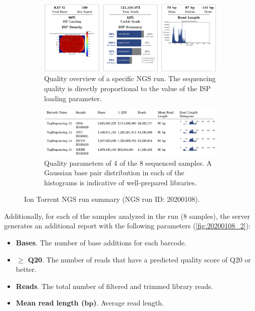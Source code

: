 \begin{figure}[ht]
    \centering
    \begin{subfigure}{0.85\textwidth}
        \centering
        \includegraphics[width=\textwidth]{Images/chapter_3/20200108/20200108_1.png}
        \caption{Quality overview of a specific NGS run. The sequencing quality is directly proportional to the value of the ISP loading parameter. \\}
        \label{fig:20200108_1}
    \end{subfigure}
    \hfill
    \begin{subfigure}{0.85\textwidth}
        \centering
        \includegraphics[width=\textwidth]{Images/chapter_3/20200108/20200108_2_v2.png}
        \caption{Quality parameters of 4 of the 8 sequenced samples. A Gaussian  base pair distribution in each of the histograms is indicative of well-prepared libraries.}
        \label{fig:20200108_2}
    \end{subfigure}
    \hfill
    \caption{Ion Torrent\texttrademark{} NGS run summary (NGS run ID: 20200108).}
    \label{fig:NGS_summary}
\end{figure}

Additionally, for each of the samples analyzed in the run (8 samples), the server generates an additional report with the following parameters (\autoref{fig:20200108_2}):
\begin{itemize}
    \item \textbf{Bases}. The number of base additions for each barcode.
    \item \textbf{$\boldsymbol{\ge}$ Q20}. The number of reads that have a predicted quality score of Q20 or better.
    \item \textbf{Reads}. The total number of filtered and trimmed library reads.
    \item \textbf{Mean read length ($\boldsymbol{bp}$)}. Average read length.
\end{itemize}

